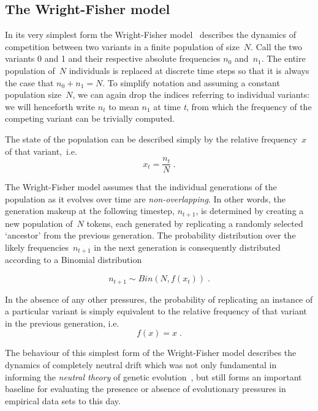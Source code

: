 \subsection{The Wright-Fisher model}
\label{sec:wrightfisher}
In its very simplest form the Wright-Fisher model~\citep[for its original formulation see][]{Wright1931} describes the dynamics of competition between two variants in a finite population of size~$N$.
Call the two variants 0 and 1 and their respective absolute frequencies $n_0$ and~$n_1$. The entire population of~$N$ individuals is replaced at discrete time steps so that it is always the case that $n_0 + n_1 = N$. To simplify notation and assuming a constant population size~$N$, we can again drop the indices referring to individual variants: we will henceforth write $n_t$ to mean $n_1$ at time \emph{t}, from which the frequency of the competing variant can be trivially computed.

The state of the population can be described simply by the relative frequency~$x$ of that variant,~i.e.
\begin{equation}
x_t = \frac{n_t}{N}\;.
\end{equation}

The Wright-Fisher model assumes that the individual generations of the population as it evolves over time are \emph{non-overlapping}. In other words, the generation makeup at the following timestep, $n_{t+1}$, is determined by creating a new population of~$N$ tokens, each generated by replicating a randomly selected `ancestor' from the previous generation.
The probability distribution over the likely frequencies~$n_{t+1}$ in the next generation is consequently distributed according to a Binomial distribution

\begin{equation}
\label{eq:binomialsampling}
n_{t+1} \sim Bin(N, f(x_t))\;.
\end{equation}

In the absence of any other pressures, the probability of replicating an instance of a particular variant is simply equivalent to the relative frequency of that variant in the previous generation, i.e.
\begin{equation}
f(x) = x\;.
\end{equation}

The behaviour of this simplest form of the Wright-Fisher model describes the dynamics of completely neutral drift which was not only fundamental in informing the \emph{neutral theory} of genetic evolution~\citep{Kimura1968,Kimura1983}, but still forms an important baseline for evaluating the presence or absence of evolutionary pressures in empirical data sets to this day. %

